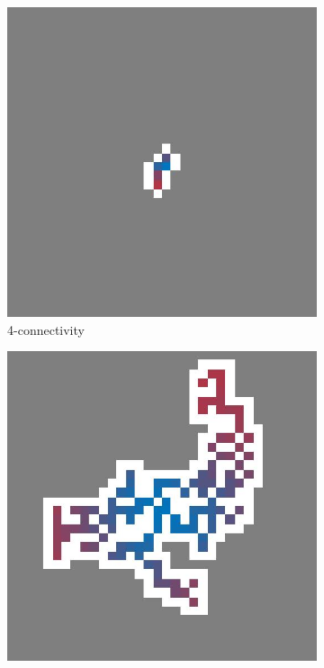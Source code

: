 \begin{figure}[b!]
	\centering
	\begin{subfigure}{0.45\columnwidth}
		\centering
		\includegraphics[width=\textwidth]{img/assignment_connectivity_four_N80_p3.jpeg}
		\caption{4-connectivity}
		\label{fig:exp:connectivity:fourConnect}
	\end{subfigure}
	\begin{subfigure}{0.45\columnwidth}
		\centering
		\includegraphics[width=\textwidth]{img/assignment_connectivity_eight_N80_p3.jpeg}

\end{subfigure}
\end{figure}
